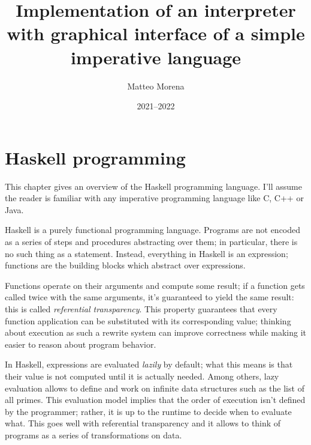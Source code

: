 \documentclass[UdineBachThesis,american,11pt,draft]{PhdThesis}
\author{Matteo Morena}
\date{2021--2022}
\title{
  Implementation of an interpreter with graphical interface of a simple
  imperative language
}
\begin{document}
  \maketitle

  \frontmatter

  \pagestyle{empty}

  \tableofcontents

  \mainmatter

  \pagestyle{serif}

  \introduction



  \chapter{Haskell programming}

  This chapter gives an overview of the Haskell programming language. I'll
  assume the reader is familiar with any imperative programming language like C,
  C++ or Java.

  Haskell is a purely functional programming language. Programs are not encoded
  as a series of steps and procedures abstracting over them; in particular,
  there is no such thing as a statement. Instead, everything in Haskell is an
  expression; functions are the building blocks which abstract over expressions.

  Functions operate on their arguments and compute some result; if a function
  gets called twice with the same arguments, it's guaranteed to yield the same
  result: this is called \emph{referential transparency}. This property
  guarantees that every function application can be substituted with its
  corresponding value; thinking about execution as such a rewrite system can
  improve correctness while making it easier to reason about program behavior.

  In Haskell, expressions are evaluated \emph{lazily} by default; what this
  means is that their value is not computed until it is actually needed. Among
  others, lazy evaluation allows to define and work on infinite data structures
  such as the list of all primes. This evaluation model implies that the order
  of execution isn't defined by the programmer; rather, it is up to the runtime
  to decide when to evaluate what. This goes well with referential transparency
  and it allows to think of programs as a series of transformations on data.
\end{document}

